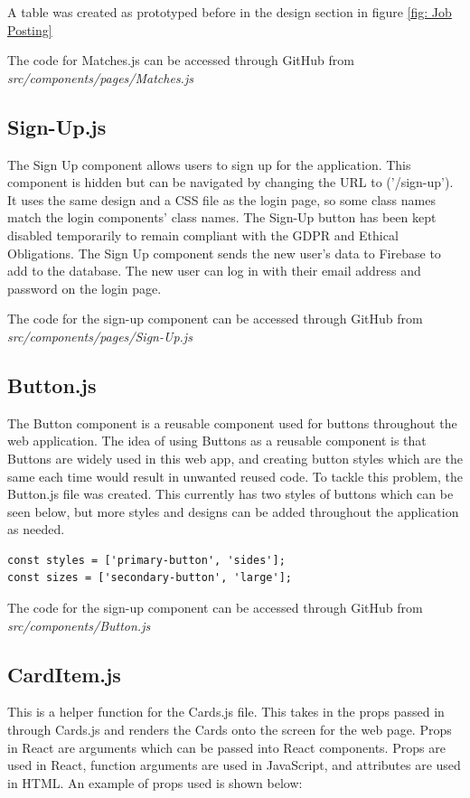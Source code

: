 A table was created as prototyped before in the design section in figure \ref{fig: Job Posting}

The code for Matches.js can be accessed through GitHub from \textit{src/components/pages/Matches.js}

\subsection{Sign-Up.js}
The Sign Up component allows users to sign up for the application. This component is hidden but can be navigated by changing the URL to ('/sign-up'). It uses the same design and a CSS file as the login page, so some class names match the login components' class names. The Sign-Up button has been kept disabled temporarily to remain compliant with the GDPR and Ethical Obligations. The Sign Up component sends the new user's data to Firebase to add to the database. The new user can log in with their email address and password on the login page.

The code for the sign-up component can be accessed through GitHub from \newline \textit{src/components/pages/Sign-Up.js}

\subsection{Button.js}
The Button component is a reusable component used for buttons throughout the web application. The idea of using Buttons as a reusable component is that Buttons are widely used in this web app, and creating button styles which are the same each time would result in unwanted reused code. To tackle this problem, the Button.js file was created. This currently has two styles of buttons which can be seen below, but more styles and designs can be added throughout the application as needed.

\begin{lstlisting}
const styles = ['primary-button', 'sides'];
const sizes = ['secondary-button', 'large'];
\end{lstlisting}

The code for the sign-up component can be accessed through GitHub from \newline \textit{src/components/Button.js}

\subsection{CardItem.js}
This is a helper function for the Cards.js file. This takes in the props passed in through Cards.js and renders the Cards onto the screen for the web page. Props in React are arguments which can be passed into React components. Props are used in React, function arguments are used in JavaScript, and attributes are used in HTML. An example of props used is shown below:

